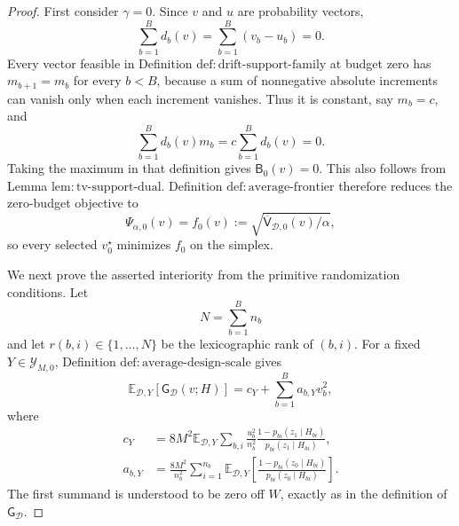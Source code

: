 \documentclass{article}
\begin{document}
\begin{proof}
First consider \(\gamma=0\).  Since \(v\) and \(u\) are probability vectors,
\[
 \sum_{b=1}^B d_b(v)=\sum_{b=1}^B(v_b-u_b)=0.
\]
Every vector feasible in Definition \(\mathrm{def:drift\text{-}support\text{-}family}\) at budget zero has \(m_{b+1}=m_b\) for every \(b<B\), because a sum of nonnegative absolute increments can vanish only when each increment vanishes.  Thus it is constant, say \(m_b=c\), and
\[
 \sum_{b=1}^B d_b(v)m_b=c\sum_{b=1}^B d_b(v)=0.
\]
Taking the maximum in that definition gives \(\mathsf B_0(v)=0\).  This also follows from Lemma \(\mathrm{lem:tv\text{-}support\text{-}dual}\).  Definition \(\mathrm{def:average\text{-}frontier}\) therefore reduces the zero-budget objective to
\[
 \Psi_{\alpha,0}(v)=
 f_0(v):=\sqrt{\overline{\mathsf V}_{\mathcal D,0}(v)/\alpha},
\]
so every selected \(v_0^\star\) minimizes \(f_0\) on the simplex.

We next prove the asserted interiority from the primitive randomization conditions.  Let
\[
 N=\sum_{b=1}^B n_b
\]
and let \(r(b,i)\in\{1,\ldots,N\}\) be the lexicographic rank of \((b,i)\).  For a fixed \(Y\in\mathcal Y_{M,0}\), Definition \(\mathrm{def:average\text{-}design\text{-}scale}\) gives
\[
 \mathbb E_{\mathcal D,Y}[\mathsf G_{\mathcal D}(v;H)]
 =c_Y+\sum_{b=1}^B a_{b,Y}v_b^2,
\]
where
\[
 \begin{aligned}
 c_Y&=8M^2\mathbb E_{\mathcal D,Y}
 \sum_{b,i}\frac{u_b^2}{n_b^2}
 \frac{1-p_{bi}(z_1\mid H_{bi})}{p_{bi}(z_1\mid H_{bi})},\\
 a_{b,Y}&=\frac{8M^2}{n_b^2}\sum_{i=1}^{n_b}
 \mathbb E_{\mathcal D,Y}\!\left[
 \frac{1-p_{bi}(z_0\mid H_{bi})}{p_{bi}(z_0\mid H_{bi})}
 \right].
 \end{aligned}
\]
The first summand is understood to be zero off \(W\), exactly as in the definition of \(\mathsf G_{\mathcal D}\).


\end{proof}
\end{document}

